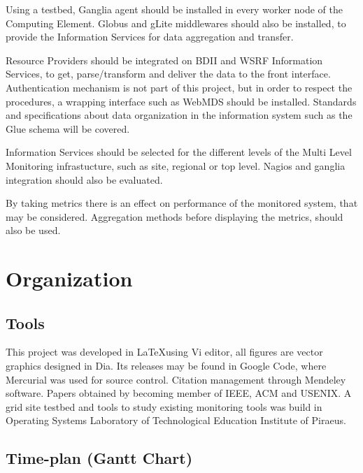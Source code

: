 Using a testbed, Ganglia agent should be installed in every worker node of the Computing Element. Globus and gLite middlewares should also be installed, to provide the Information Services for data aggregation and transfer.

Resource Providers should be integrated on BDII and WSRF Information Services, to get, parse/transform and deliver the data to the front interface. Authentication mechanism is not part of this project, but in order to respect the procedures, a wrapping interface such as WebMDS should be installed. Standards and specifications about data organization in the information system such as the Glue schema will be covered.

Information Services should be selected for the different levels of the Multi Level Monitoring infrastucture, such as site, regional or top level. Nagios and ganglia integration should also be evaluated.

By taking metrics there is an effect on performance of the monitored system, that may be considered. Aggregation methods before displaying the metrics, should also be used.

\section{Organization}

\subsection[Tools]{Tools}
This project was developed in \LaTeX using Vi editor, all figures are vector graphics designed in Dia. Its releases may be found in Google Code, where Mercurial was used for source control. Citation management through Mendeley software. Papers obtained by becoming member of IEEE, ACM and USENIX. A grid site testbed and tools to study existing monitoring tools was build in Operating Systems Laboratory of Technological Education Institute of Piraeus.

\subsection[Time plan]{Time-plan (Gantt Chart)}

